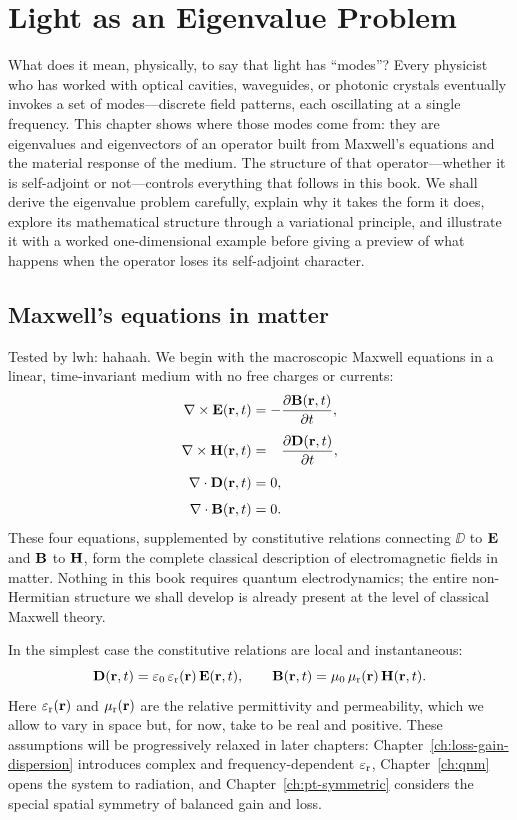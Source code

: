 \chapter{Light as an Eigenvalue Problem}
\label{ch:light-eigenvalue}

\begin{chapterlead}
What does it mean, physically, to say that light has ``modes''? Every physicist who has
worked with optical cavities, waveguides, or photonic crystals eventually
invokes a set of modes---discrete field patterns, each oscillating at a
single frequency. This chapter shows where those modes come from:
they are eigenvalues and eigenvectors of an operator built from
Maxwell's equations and the material response of the medium.
The structure of that operator---whether it is self-adjoint or not---controls
everything that follows in this book. We shall derive the eigenvalue
problem carefully, explain why it takes the form it does, explore its
mathematical structure through a variational principle, and illustrate it
with a worked one-dimensional example before giving a preview of what
happens when the operator loses its self-adjoint character.
\end{chapterlead}


\section{Maxwell's equations in matter}
\label{sec:maxwell-matter}
Tested by lwh: hahaah.
We begin with the macroscopic Maxwell equations in a linear, time-invariant
medium with no free charges or currents:
\begin{align}
 \nabla\times \mathbf{E}(\mathbf{r},t) &= -\frac{\partial \mathbf{B}(\mathbf{r},t)}{\partial t}, \label{eq:faraday}\\[4pt]
 \nabla\times \mathbf{H}(\mathbf{r},t) &= \phantom{-}\frac{\partial \mathbf{D}(\mathbf{r},t)}{\partial t}, \label{eq:ampere}\\[4pt]
 \nabla\cdot \mathbf{D}(\mathbf{r},t) &= 0, \label{eq:gauss-e}\\[4pt]
 \nabla\cdot \mathbf{B}(\mathbf{r},t) &= 0. \label{eq:gauss-m}
\end{align}
These four equations, supplemented by constitutive relations connecting
$\DD$ to $\mathbf{E}$ and $\mathbf{B}$ to $\mathbf{H}$, form the complete classical description of
electromagnetic fields in matter. Nothing in this book requires quantum
electrodynamics; the entire non-Hermitian structure we shall develop is
already present at the level of classical Maxwell theory.

In the simplest case the constitutive relations are local and instantaneous:
\begin{equation}
 \mathbf{D}(\mathbf{r},t) = \varepsilon_0\,\varepsilon_{\mathrm{r}}(\mathbf{r})\,\mathbf{E}(\mathbf{r},t),
 \qquad
 \mathbf{B}(\mathbf{r},t) = \mu_0\,\mu_{\mathrm{r}}(\mathbf{r})\,\mathbf{H}(\mathbf{r},t).
 \label{eq:constitutive-simple}
\end{equation}
Here $\varepsilon_{\mathrm{r}}(\mathbf{r})$ and $\mu_{\mathrm{r}}(\mathbf{r})$ are the relative permittivity and
permeability, which we allow to vary in space but, for now, take to be real
and positive. These assumptions will be progressively relaxed in later
chapters: Chapter~\ref{ch:loss-gain-dispersion} introduces complex and
frequency-dependent $\varepsilon_{\mathrm{r}}$, Chapter~\ref{ch:qnm} opens the system to
radiation, and Chapter~\ref{ch:pt-symmetric} considers the special spatial
symmetry of balanced gain and loss.

